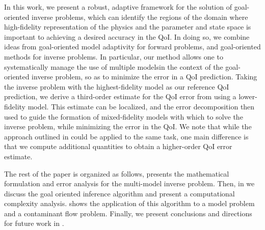 In this work, we present a robust, adaptive framework for the solution of goal-oriented inverse problems, which can identify the regions of the domain where high-fidelity representation of the physics and the parameter and state space is important to achieving a desired accuracy in the QoI. In doing so, we combine ideas from goal-oriented model adaptivity for forward problems, and goal-oriented methods for inverse problems. In particular, our method allows one to systematically manage the use of multiple modelsin the context of the goal-oriented inverse problem, so as to minimize the error in a QoI prediction. Taking the inverse problem with the highest-fidelity model as our reference QoI prediction, we derive a third-order estimate for the QoI error from using a lower-fidelity model. This estimate can be localized, and the error decomposition then used to guide the formation of mixed-fidelity models with which to solve the inverse problem, while minimizing the error in the QoI. We note that while the approach outlined in \cite{OdenPrudetal10} could be applied to the same task, one main difference is that we compute additional quantities to obtain a higher-order QoI error estimate.

The rest of the paper is organized as follows,  presents the mathematical formulation and error analysis for the multi-model inverse problem. Then, in  we discuss the goal oriented inference algorithm and present a computational complexity analysis.  shows the application of this algorithm to a model problem and a contaminant flow problem. Finally, we present conclusions and directions for future work in .
